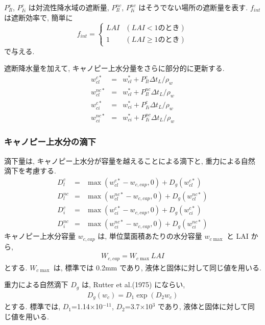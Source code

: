 $P_{Il}^{c}$, $P_{Ii}^{c}$ は対流性降水域の遮断量, $P_{Il}^{nc}$,
$P_{Ii}^{nc}$ はそうでない場所の遮断量を表す.
$f_{int}$ は遮断効率で, 簡単に
\begin{equation}
 f_{int} = \left\{
\begin{array}{ll}
 LAI & (LAI < 1 \mbox{のとき})\\
 1   & (LAI \geq 1 \mbox{のとき})
\end{array}
\right.
\end{equation}
で与える.

遮断降水量を加えて, キャノピー上水分量をさらに部分的に更新する.
\begin{eqnarray}
 w_{cl}^{c*} &=& w_{cl}^*  + P_{Il}^c    \Delta t_L / \rho_w \\
 w_{cl}^{nc*}&=& w_{cl}^*  + P_{Il}^{nc} \Delta t_L / \rho_w \\
 w_{ci}^{c*} &=& w_{ci}^*  + P_{Ii}^c    \Delta t_L / \rho_w \\
 w_{ci}^{nc*}&=& w_{ci}^*  + P_{Ii}^{nc} \Delta t_L / \rho_w
\end{eqnarray}

\subsubsection{キャノピー上水分の滴下}

滴下量は, キャノピー上水分が容量を越えることによる滴下と, 重力による自然
滴下を考慮する.
\begin{eqnarray}
 D_l^c    & = & \max( w_{cl}^{c*} - w_{c,cap}, 0 ) + D_{g}(w_{cl}^{c*}) \\
 D_l^{nc} & = & \max( w_{cl}^{nc*}- w_{c,cap}, 0 ) + D_{g}(w_{cl}^{nc*}) \\
 D_i^c    & = & \max( w_{ci}^{c*} - w_{c,cap}, 0 ) + D_{g}(w_{ci}^{c*}) \\
 D_i^{nc} & = & \max( w_{ci}^{nc*}- w_{c,cap}, 0 ) + D_{g}(w_{ci}^{nc*})
\end{eqnarray}
キャノピー上水分容量 $w_{c,cap}$ は, 単位葉面積あたりの水分容量
$w_{c\max}$ と LAI から,
\begin{eqnarray}
 W_{c,cap} = W_{c\max} LAI
\end{eqnarray}
とする.
$W_{c\max}$ は, 標準では 0.2mm であり, 液体と固体に対して同じ値を用いる.

重力による自然滴下 $D_g$ は, Rutter et al.(1975) にならい,
\begin{eqnarray}
 D_g(w_c) = D_1 \exp(D_2 w_c)
\end{eqnarray}
とする. 標準では, $D_1$=1.14$\times$10$^{-11}$,
$D_2$=3.7$\times$10$^{3}$ であり, 液体と固体に対して同じ値を用いる.


